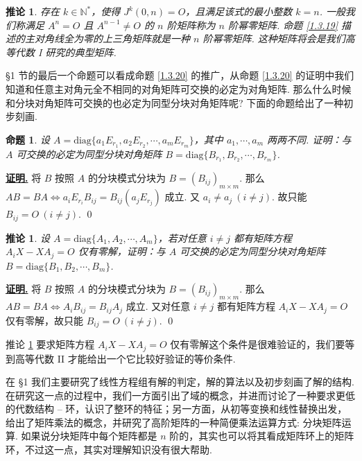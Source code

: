 \documentclass[10pt,openany]{article}
\theoremstyle{thmstyle} %
\theoremstyle{defstyle} %
\newtheorem{corollary}[theorem]{推论}
\theoremstyle{prostyle} %
\newtheorem{proposition}[theorem]{命题}
\theoremstyle{exastyle}
\theoremstyle{remstyle}
\renewenvironment{proof}[1][证明]{\par\underline{\textbf{#1.}} \;\fangsong}{\qed\par}
\newcommand{\diag}{\mathrm{diag}}
\begin{document}
\begin{corollary}
	存在 \( k \in \mathbb{N}^* \)，使得 \( J^k(0,n)=O \)，且满足该式的最小整数 \( k=n \). 一般我们称满足 \( A^n=O \) 且 \( A^{n-1} \neq O \) 的 \( n \) 阶矩阵称为 \( n \) 阶幂零矩阵. 命题 \ref{1.3.19} 描述的主对角线全为零的上三角矩阵就是一种 \( n \) 阶幂零矩阵. 这种矩阵将会是我们高等代数 I 研究的典型矩阵.
\end{corollary}

\S 1 节的最后一个命题可以看成命题 \ref{1.3.20} 的推广，从命题 \ref{1.3.20} 的证明中我们知道和任意主对角元全不相同的对角矩阵可交换的必定为对角矩阵. 那么什么时候和分块对角矩阵可交换的也必定为同型分块对角矩阵呢? 下面的命题给出了一种初步刻画.

\begin{proposition}
	设 \( A=\diag\{ a_1E_{r_1},a_2E_{r_2},\cdots,a_mE_{r_m}\} \)，其中 \( a_1,\cdots,a_m \) 两两不同. 证明：与 \( A \) 可交换的必定为同型分块对角矩阵 \( B=\diag\{B_{r_1},B_{r_2},\cdots,B_{r_m}\} \).
\end{proposition}

\begin{proof}
	将 \( B \) 按照 \( A \) 的分块模式分块为 \( B=(B_{ij})_{m \times m} \). 那么 \( AB=BA \Leftrightarrow a_iE_{r_i}B_{ij}=B_{ij}(a_jE_{r_j}) \) 成立. 又 \( a_i \neq a_j \ (i \neq j) \). 故只能 \( B_{ij}=O \ (i \neq j) \).
\end{proof}

\begin{corollary}	\label{1.4.9}
	设 \( A=\diag\{ A_1,A_2,\cdots,A_m\} \)，若对任意 \( i \neq j \) 都有矩阵方程 \( A_iX-XA_j=O \) 仅有零解，证明：与 \( A \) 可交换的必定为同型分块对角矩阵 \( B=\diag\{B_1,B_2,\cdots,B_m\} \).

\end{corollary}

\begin{proof}
	将 \( B \) 按照 \( A \) 的分块模式分块为 \( B=(B_{ij})_{m \times m} \). 那么 \( AB=BA \Leftrightarrow A_iB_{ij}=B_{ij}A_j  \) 成立. 又对任意 \( i \neq j \) 都有矩阵方程 \( A_iX-XA_j=O \) 仅有零解，故只能 \( B_{ij}=O \ (i \neq j) \).
\end{proof}



推论 \ref{1.4.9} 要求矩阵方程 \( A_iX-XA_j=O \) 仅有零解这个条件是很难验证的，我们要等到高等代数 II 才能给出一个它比较好验证的等价条件.

在 \S 1 我们主要研究了线性方程组有解的判定，解的算法以及初步刻画了解的结构. 在研究这一点的过程中，我们一方面引出了域的概念，并进而讨论了一种要求更低的代数结构 -- 环，认识了整环的特征；另一方面，从初等变换和线性替换出发，给出了矩阵乘法的概念，并研究了高阶矩阵的一种简便乘法运算方式: 分块矩阵运算. 如果说分块矩阵中每个矩阵都是 \( n \) 阶的，其实也可以将其看成矩阵环上的矩阵环，不过这一点，其实对理解知识没有很大帮助.
\end{document}
